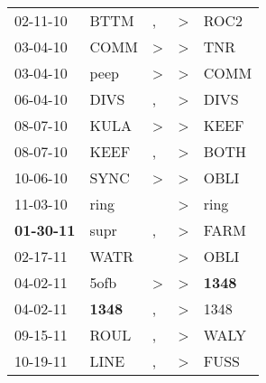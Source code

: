 \begin{supertabular}{p{0.07\textwidth}p{0.06\textwidth}p{0.02\textwidth}p{0.02\textwidth}p{0.06\textwidth}}
          02-11-10\textsuperscript{} &           BTTM\textsuperscript{} &                , &     \textgreater &           ROC2\textsuperscript{} \\
          03-04-10\textsuperscript{} &           COMM\textsuperscript{} &     \textgreater &     \textgreater &            TNR\textsuperscript{} \\
          03-04-10\textsuperscript{} &           peep\textsuperscript{} &     \textgreater &     \textgreater &           COMM\textsuperscript{} \\
          06-04-10\textsuperscript{} &           DIVS\textsuperscript{} &                , &     \textgreater &           DIVS\textsuperscript{} \\
          08-07-10\textsuperscript{} &           KULA\textsuperscript{} &     \textgreater &     \textgreater &           KEEF\textsuperscript{} \\
          08-07-10\textsuperscript{} &           KEEF\textsuperscript{} &                , &     \textgreater &           BOTH\textsuperscript{} \\
          10-06-10\textsuperscript{} &           SYNC\textsuperscript{} &     \textgreater &     \textgreater &           OBLI\textsuperscript{} \\
          11-03-10\textsuperscript{} &           ring\textsuperscript{} &                  &     \textgreater &           ring\textsuperscript{} \\
 \textbf{01-30-11\textsuperscript{}} &           supr\textsuperscript{} &                , &     \textgreater &           FARM\textsuperscript{} \\
          02-17-11\textsuperscript{} &           WATR\textsuperscript{} &                  &     \textgreater &           OBLI\textsuperscript{} \\
          04-02-11\textsuperscript{} &           5ofb\textsuperscript{} &     \textgreater &     \textgreater &  \textbf{1348\textsuperscript{}} \\
          04-02-11\textsuperscript{} &  \textbf{1348\textsuperscript{}} &                , &     \textgreater &           1348\textsuperscript{} \\
          09-15-11\textsuperscript{} &           ROUL\textsuperscript{} &                , &     \textgreater &           WALY\textsuperscript{} \\
          10-19-11\textsuperscript{} &           LINE\textsuperscript{} &                , &     \textgreater &           FUSS\textsuperscript{} \\

\end{supertabular}
